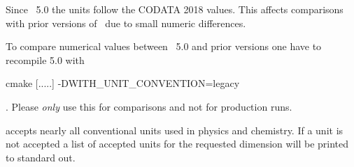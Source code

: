 Since \siesta\ 5.0 the units follow the CODATA 2018 values. This
affects comparisons with prior versions of \siesta\ due to small
numeric differences.

To compare numerical values between \siesta\ 5.0 and prior versions one
have to recompile 5.0 with
\begin{shellexample}
  cmake [.....] -DWITH_UNIT_CONVENTION=legacy
\end{shellexample}
. Please
\emph{only} use this for comparisons and not for production runs.

 accepts nearly all conventional units used in physics
and chemistry. If a unit is not accepted a list of accepted units for
the requested dimension will be printed to standard out.